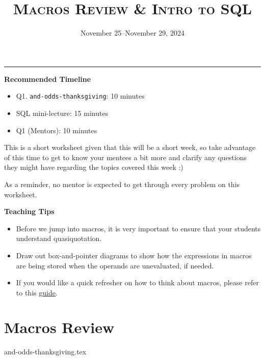\documentclass{exam}
\title{\textsc{Macros Review \& Intro to SQL}}
\date{November 25--November 29, 2024}
\begin{document}
\maketitle
\rule{\textwidth}{0.15em}

\begin{meta}
\begin{blocksection}
    \textbf{Recommended Timeline}
    \begin{itemize}
        \item Q1. \lstinline{and-odds-thanksgiving}: 10 minutes
        \item SQL mini-lecture: 15 minutes
        \item Q1 (Mentors): 10 minutes
        \end{itemize}
\end{blocksection}
\vspace{5mm}
This is a short worksheet given that this will be a short week, so take advantage of this time to get to know your mentees a bit more and clarify any questions they might have regarding the topics covered this week :)

As a reminder, no mentor is expected to get through every problem on this worksheet.
\end{meta}

\vspace{3mm}

\begin{meta}
\textbf{Teaching Tips}
\begin{itemize}
    \item Before we jump into macros, it is very important to ensure that your students understand quasiquotation.
    \item Draw out box-and-pointer diagrams to show how the expressions in macros are being stored when the operands are unevaluated, if needed.
    \item If you would like a quick refresher on how to think about macros, please refer to this \href{https://docs.google.com/document/d/1JSbvtJ5bYUEhovDZd_gQnBvkG_WDcafmX-4B3QeIXZU/edit}{guide}.
\end{itemize}
\end{meta}

\vspace{2mm}

\section{Macros Review}
\begin{questions}
\small
{and-odds-thanksgiving.tex}
\normalsize
\newpage
\end{questions}
\end{document}
